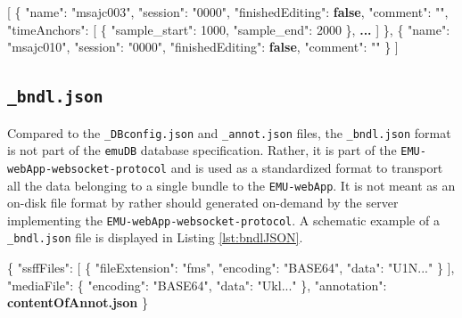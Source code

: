 \documentclass[]{book}
\newenvironment{Shaded}{\begin{snugshade}}{\end{snugshade}}
\newcommand{\DataTypeTok}[1]{\textcolor[rgb]{0.13,0.29,0.53}{#1}}
\newcommand{\DecValTok}[1]{\textcolor[rgb]{0.00,0.00,0.81}{#1}}
\newcommand{\ErrorTok}[1]{\textcolor[rgb]{0.64,0.00,0.00}{\textbf{#1}}}
\newcommand{\FunctionTok}[1]{\textcolor[rgb]{0.00,0.00,0.00}{#1}}
\newcommand{\KeywordTok}[1]{\textcolor[rgb]{0.13,0.29,0.53}{\textbf{#1}}}
\newcommand{\OtherTok}[1]{\textcolor[rgb]{0.56,0.35,0.01}{#1}}
\newcommand{\StringTok}[1]{\textcolor[rgb]{0.31,0.60,0.02}{#1}}
\theoremstyle{definition}
\theoremstyle{definition}
\theoremstyle{definition}
\theoremstyle{remark}
\begin{document}
\begin{Shaded}
\begin{Highlighting}[]
\OtherTok{[}
  \FunctionTok{\{}
  \DataTypeTok{"name"}\FunctionTok{:} \StringTok{"msajc003"}\FunctionTok{,}
  \DataTypeTok{"session"}\FunctionTok{:} \StringTok{"0000"}\FunctionTok{,}
  \DataTypeTok{"finishedEditing"}\FunctionTok{:} \KeywordTok{false}\FunctionTok{,}
  \DataTypeTok{"comment"}\FunctionTok{:} \StringTok{""}\FunctionTok{,}
  \DataTypeTok{"timeAnchors"}\FunctionTok{:} \OtherTok{[}
    \FunctionTok{\{}
      \DataTypeTok{"sample_start"}\FunctionTok{:} \DecValTok{1000}\FunctionTok{,}
      \DataTypeTok{"sample_end"}\FunctionTok{:} \DecValTok{2000}
    \FunctionTok{\}}\OtherTok{,} \ErrorTok{...}
  \OtherTok{]}
  \FunctionTok{\}}\OtherTok{,}
  \FunctionTok{\{}
  \DataTypeTok{"name"}\FunctionTok{:} \StringTok{"msajc010"}\FunctionTok{,}
  \DataTypeTok{"session"}\FunctionTok{:} \StringTok{"0000"}\FunctionTok{,}
  \DataTypeTok{"finishedEditing"}\FunctionTok{:} \KeywordTok{false}\FunctionTok{,}
  \DataTypeTok{"comment"}\FunctionTok{:} \StringTok{""}
  \FunctionTok{\}}
\OtherTok{]}
\end{Highlighting}
\end{Shaded}

\hypertarget{subsec:app_chapExampleFilesBndlJSON}{%
\subsection{\texorpdfstring{\texttt{\_bndl.json}}{\_bndl.json}}\label{subsec:app_chapExampleFilesBndlJSON}}

Compared to the \texttt{\_DBconfig.json} and \texttt{\_annot.json}
files, the \texttt{\_bndl.json} format is not part of the \texttt{emuDB}
database specification. Rather, it is part of the
\texttt{EMU-webApp-websocket-protocol} and is used as a standardized
format to transport all the data belonging to a single bundle to the
\texttt{EMU-webApp}. It is not meant as an on-disk file format by rather
should generated on-demand by the server implementing the
\texttt{EMU-webApp-websocket-protocol}. A schematic example of a
\texttt{\_bndl.json} file is displayed in Listing \ref{lst:bndlJSON}.

\begin{Shaded}
\begin{Highlighting}[]
\FunctionTok{\{}
 \DataTypeTok{"ssffFiles"}\FunctionTok{:} \OtherTok{[}
  \FunctionTok{\{}
   \DataTypeTok{"fileExtension"}\FunctionTok{:} \StringTok{"fms"}\FunctionTok{,}
   \DataTypeTok{"encoding"}\FunctionTok{:} \StringTok{"BASE64"}\FunctionTok{,}
   \DataTypeTok{"data"}\FunctionTok{:} \StringTok{"U1N..."}
  \FunctionTok{\}}
 \OtherTok{]}\FunctionTok{,}
 \DataTypeTok{"mediaFile"}\FunctionTok{:} \FunctionTok{\{}
  \DataTypeTok{"encoding"}\FunctionTok{:} \StringTok{"BASE64"}\FunctionTok{,}
  \DataTypeTok{"data"}\FunctionTok{:} \StringTok{"Ukl..."}
 \FunctionTok{\},}
 \DataTypeTok{"annotation"}\FunctionTok{:} \ErrorTok{contentOfAnnot.json}
\FunctionTok{\}}
\end{Highlighting}
\end{Shaded}
\end{document}
